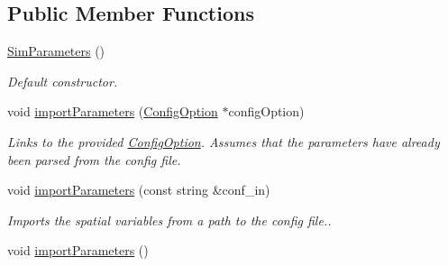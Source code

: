 \subsection*{Public Member Functions}
\begin{DoxyCompactItemize}
\item 
\hyperlink{struct_sim_parameters_aa91bc46ea6909abeeb7488c36da269ee}{Sim\+Parameters} ()\hypertarget{struct_sim_parameters_aa91bc46ea6909abeeb7488c36da269ee}{}\label{struct_sim_parameters_aa91bc46ea6909abeeb7488c36da269ee}

\begin{DoxyCompactList}\small\item\em Default constructor. \end{DoxyCompactList}\item 
void \hyperlink{struct_sim_parameters_affb4a6133434c61c720b648012ccbcea}{import\+Parameters} (\hyperlink{class_config_option}{Config\+Option} $\ast$config\+Option)
\begin{DoxyCompactList}\small\item\em Links to the provided \hyperlink{class_config_option}{Config\+Option}. Assumes that the parameters have already been parsed from the config file. \end{DoxyCompactList}\item 
void \hyperlink{struct_sim_parameters_a2c587f1f41e13c51696ca24e5edadc96}{import\+Parameters} (const string \&conf\+\_\+in)
\begin{DoxyCompactList}\small\item\em Imports the spatial variables from a path to the config file.. \end{DoxyCompactList}\item 
void \hyperlink{struct_sim_parameters_a65833f22d1f30997727ed71e989af02e}{import\+Parameters} ()\hypertarget{struct_sim_parameters_a65833f22d1f30997727ed71e989af02e}{}\label{struct_sim_parameters_a65833f22d1f30997727ed71e989af02e}


\end{DoxyCompactItemize}
